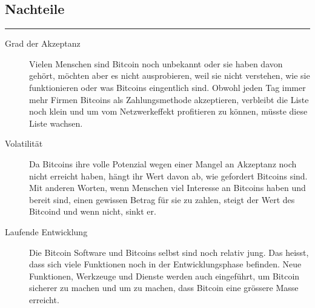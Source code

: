 \subsection*{Nachteile}
\vspace{-10mm}
\noindent\rule{0.8\textwidth}{0.4pt}
\begin{description}
  \item[Grad der Akzeptanz] Vielen Menschen sind Bitcoin noch unbekannt oder sie haben davon
  gehört, möchten aber es nicht ausprobieren, weil sie nicht verstehen, wie sie funktionieren
  oder was Bitcoins eingentlich sind. Obwohl jeden Tag immer mehr Firmen Bitcoins als Zahlungsmethode
  akzeptieren, verbleibt die Liste noch klein und um vom Netzwerkeffekt profitieren zu können, müsste
  diese Liste wachsen.
  \item[Volatilität] Da Bitcoins ihre volle Potenzial wegen einer Mangel an Akzeptanz noch nicht
  erreicht haben, hängt ihr Wert davon ab, wie gefordert Bitcoins sind. Mit anderen Worten, wenn Menschen
  viel Interesse an Bitcoins haben und bereit sind, einen gewissen Betrag für sie zu zahlen, steigt der
  Wert des Bitcoind und wenn nicht, sinkt er.
  \item[Laufende Entwicklung] Die Bitcoin Software und Bitcoins selbst sind noch relativ jung. Das heisst,
  dass sich viele Funktionen noch in der Entwicklungsphase befinden. Neue Funktionen, Werkzeuge und Dienste
  werden auch eingeführt, um Bitcoin sicherer zu machen und um zu machen, dass Bitcoin eine grössere Masse
  erreicht.

\end{description}
